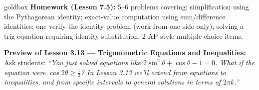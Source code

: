 \documentclass[10pt]{article}
\begin{document}
\vspace{0.08in}

\begin{skillbox}{goldbox}
\textbf{Homework (Lesson 7.5):} 5--6 problems covering: simplification using
the Pythagorean identity; exact-value computation using sum/difference identities;
one verify-the-identity problem (work from one side only); solving a trig equation
requiring identity substitution; 2 AP-style multiple-choice items.

\textbf{Preview of Lesson 3.13 --- Trigonometric Equations and Inequalities:}
Ask students: \textit{``You just solved equations like $2\sin^2\theta + \cos\theta - 1 = 0$.
What if the equation were $\cos 2\theta \geq \tfrac{1}{2}$? In Lesson 3.13 we'll extend
from equations to inequalities, and from specific intervals to general solutions in terms
of $2\pi k$.''}
\end{skillbox}
\end{document}

